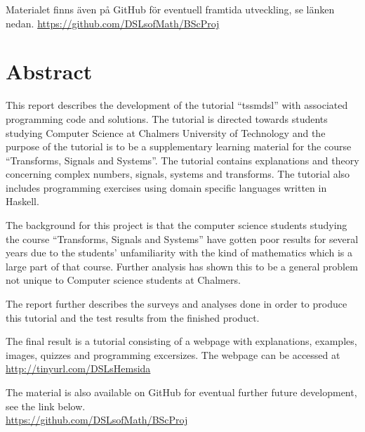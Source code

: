 \documentclass[12pt,a4paper,twoside,openright]{article}
\begin{document}
 Materialet finns även på GitHub för eventuell framtida utveckling, se
 länken nedan.  \url{https://github.com/DSLsofMath/BScProj}

\newpage

\thispagestyle{plain}

\section*{Abstract}

This report describes the development of the tutorial ``\gls{tssmdsl}''
with associated programming code and solutions. The tutorial is
directed towards students studying Computer Science at Chalmers
University of Technology and the purpose of the tutorial is to be a
supplementary learning material for the course ``Transforms, Signals
and Systems''. The tutorial contains explanations and theory
concerning complex numbers, signals, systems and transforms. The
tutorial also includes programming exercises using domain specific
languages written in Haskell.

The background for this project is that the computer science students
studying the course ``Transforms, Signals and Systems'' have gotten
poor results for several years due to the students' unfamiliarity with
the kind of mathematics which is a large part of that course. Further
analysis has shown this to be a general problem not unique to Computer
science students at Chalmers.

The report further describes the surveys and analyses done in order to
produce this tutorial and the test results from the finished product.

The final result is a tutorial consisting of a webpage with explanations,
examples, images,  quizzes and programming excersizes. The webpage
can be accessed at\\
\url{http://tinyurl.com/DSLsHemsida}

The material is also available on GitHub for eventual further future
development, see the link below.\\
\url{https://github.com/DSLsofMath/BScProj}

\newpage

\tableofcontents

\newpage

\setlength{\parskip}{1mm}
\printglossaries


\end{document}
